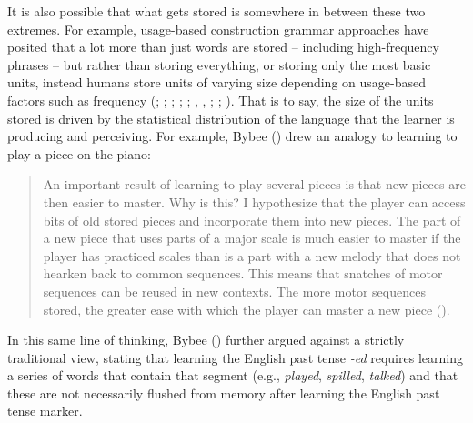 \documentclass[
  12pt,
  letterpaper,
]{scrreport}
\begin{document}
It is also possible that what gets stored is somewhere in between these
two extremes. For example, usage-based construction grammar approaches
have posited that a lot more than just words are stored -- including
high-frequency phrases -- but rather than storing everything, or storing
only the most basic units, instead humans store units of varying size
depending on usage-based factors such as frequency
(;
; ;
;
;
,
,
;
;
). That is to say, the size of the units stored is driven by the
statistical distribution of the language that the learner is producing
and perceiving. For example, Bybee () drew
an analogy to learning to play a piece on the piano:

\begin{quote}
An important result of learning to play several pieces is that new
pieces are then easier to master. Why is this? I hypothesize that the
player can access bits of old stored pieces and incorporate them into
new pieces. The part of a new piece that uses parts of a major scale is
much easier to master if the player has practiced scales than is a part
with a new melody that does not hearken back to common sequences. This
means that snatches of motor sequences can be reused in new contexts.
The more motor sequences stored, the greater ease with which the player
can master a new piece ().
\end{quote}

\noindent In this same line of thinking, Bybee
() further argued against a strictly
traditional view, stating that learning the English past tense
\emph{-ed} requires learning a series of words that contain that segment
(e.g., \emph{played}, \emph{spilled}, \emph{talked}) and that these are
not necessarily flushed from memory after learning the English past
tense marker.
\end{document}
